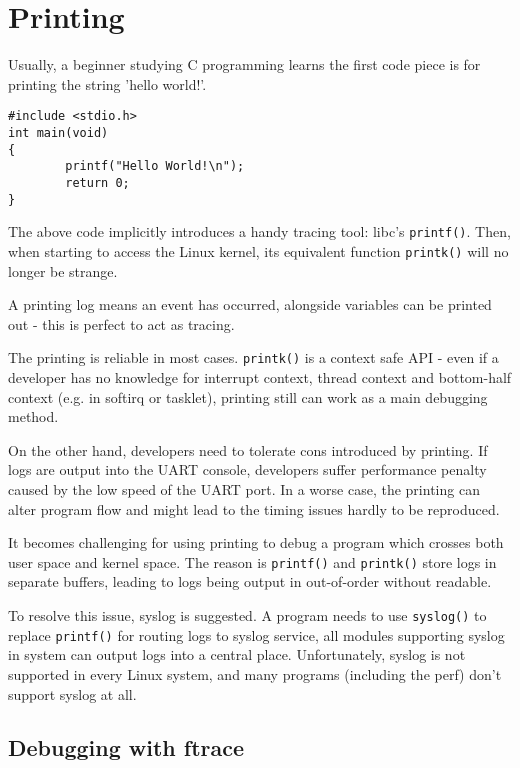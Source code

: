 \documentclass[11pt]{diazessay} %
\def\code#1{\texttt{#1}}
\begin{document}
\section*{Printing}

Usually, a beginner studying C programming learns the first code piece is for
printing the string 'hello world!'.

\begin{lstlisting}
#include <stdio.h>
int main(void)
{
        printf("Hello World!\n");
        return 0;
}
\end{lstlisting}

The above code implicitly introduces a handy tracing tool: libc's
\code{printf()}. Then, when starting to access the Linux kernel, its
equivalent function \code{printk()} will no longer be strange.

A printing log means an event has occurred, alongside variables can be printed
out - this is perfect to act as tracing.

The printing is reliable in most cases. \code{printk()} is a context safe API
- even if a developer has no knowledge for interrupt context, thread context
and bottom-half context (e.g. in softirq or tasklet), printing still can work
as a main debugging method.

On the other hand, developers need to tolerate cons introduced by printing.
If logs are output into the UART console, developers suffer performance
penalty caused by the low speed of the UART port. In a worse case, the
printing can alter program flow and might lead to the timing issues hardly to
be reproduced.

It becomes challenging for using printing to debug a program which crosses
both user space and kernel space. The reason is \code{printf()} and
\code{printk()} store logs in separate buffers, leading to logs being output
in out-of-order without readable.

To resolve this issue, syslog is suggested. A program needs to use
\code{syslog()} to replace \code{printf()} for routing logs to syslog
service, all modules supporting syslog in system can output logs into a
central place. Unfortunately, syslog is not supported in every Linux system,
and many programs (including the perf) don't support syslog at all.

\subsection*{Debugging with ftrace}
\end{document}
